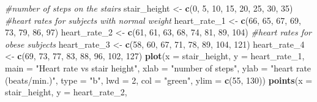 \documentclass[]{book}
\newenvironment{Shaded}{\begin{snugshade}}{\end{snugshade}}
\newcommand{\CommentTok}[1]{\textcolor[rgb]{0.56,0.35,0.01}{\textit{#1}}}
\newcommand{\DataTypeTok}[1]{\textcolor[rgb]{0.13,0.29,0.53}{#1}}
\newcommand{\DecValTok}[1]{\textcolor[rgb]{0.00,0.00,0.81}{#1}}
\newcommand{\KeywordTok}[1]{\textcolor[rgb]{0.13,0.29,0.53}{\textbf{#1}}}
\newcommand{\NormalTok}[1]{#1}
\newcommand{\StringTok}[1]{\textcolor[rgb]{0.31,0.60,0.02}{#1}}
\begin{document}
\begin{Shaded}
\begin{Highlighting}[]
\CommentTok{#number of steps on the stairs}
\NormalTok{stair_height <-}\StringTok{ }\KeywordTok{c}\NormalTok{(}\DecValTok{0}\NormalTok{, }\DecValTok{5}\NormalTok{, }\DecValTok{10}\NormalTok{, }\DecValTok{15}\NormalTok{, }\DecValTok{20}\NormalTok{, }\DecValTok{25}\NormalTok{, }\DecValTok{30}\NormalTok{, }\DecValTok{35}\NormalTok{)}
\CommentTok{#heart rates for subjects with normal weight}
\NormalTok{heart_rate_}\DecValTok{1}\NormalTok{ <-}\StringTok{ }\KeywordTok{c}\NormalTok{(}\DecValTok{66}\NormalTok{, }\DecValTok{65}\NormalTok{, }\DecValTok{67}\NormalTok{, }\DecValTok{69}\NormalTok{, }\DecValTok{73}\NormalTok{, }\DecValTok{79}\NormalTok{, }\DecValTok{86}\NormalTok{, }\DecValTok{97}\NormalTok{)}
\NormalTok{heart_rate_}\DecValTok{2}\NormalTok{ <-}\StringTok{ }\KeywordTok{c}\NormalTok{(}\DecValTok{61}\NormalTok{, }\DecValTok{61}\NormalTok{, }\DecValTok{63}\NormalTok{, }\DecValTok{68}\NormalTok{, }\DecValTok{74}\NormalTok{, }\DecValTok{81}\NormalTok{, }\DecValTok{89}\NormalTok{, }\DecValTok{104}\NormalTok{)}
\CommentTok{#heart rates for obese subjects}
\NormalTok{heart_rate_}\DecValTok{3}\NormalTok{ <-}\StringTok{ }\KeywordTok{c}\NormalTok{(}\DecValTok{58}\NormalTok{, }\DecValTok{60}\NormalTok{, }\DecValTok{67}\NormalTok{, }\DecValTok{71}\NormalTok{, }\DecValTok{78}\NormalTok{, }\DecValTok{89}\NormalTok{, }\DecValTok{104}\NormalTok{, }\DecValTok{121}\NormalTok{)}
\NormalTok{heart_rate_}\DecValTok{4}\NormalTok{ <-}\StringTok{ }\KeywordTok{c}\NormalTok{(}\DecValTok{69}\NormalTok{, }\DecValTok{73}\NormalTok{, }\DecValTok{77}\NormalTok{, }\DecValTok{83}\NormalTok{, }\DecValTok{88}\NormalTok{, }\DecValTok{96}\NormalTok{, }\DecValTok{102}\NormalTok{, }\DecValTok{127}\NormalTok{)}
\KeywordTok{plot}\NormalTok{(}\DataTypeTok{x =}\NormalTok{ stair_height,}
    \DataTypeTok{y =}\NormalTok{ heart_rate_}\DecValTok{1}\NormalTok{,}
    \DataTypeTok{main =} \StringTok{"Heart rate vs stair height"}\NormalTok{,}
    \DataTypeTok{xlab =} \StringTok{"number of steps"}\NormalTok{,}
    \DataTypeTok{ylab =} \StringTok{"heart rate (beats/min.)"}\NormalTok{,}
    \DataTypeTok{type =} \StringTok{"b"}\NormalTok{,}
    \DataTypeTok{lwd =} \DecValTok{2}\NormalTok{,}
    \DataTypeTok{col =} \StringTok{"green"}\NormalTok{,}
    \DataTypeTok{ylim =} \KeywordTok{c}\NormalTok{(}\DecValTok{55}\NormalTok{, }\DecValTok{130}\NormalTok{))}
\KeywordTok{points}\NormalTok{(}\DataTypeTok{x =}\NormalTok{ stair_height,}
    \DataTypeTok{y =}\NormalTok{ heart_rate_}\DecValTok{2}\NormalTok{,}

\end{Highlighting}
\end{Shaded}
\end{document}

